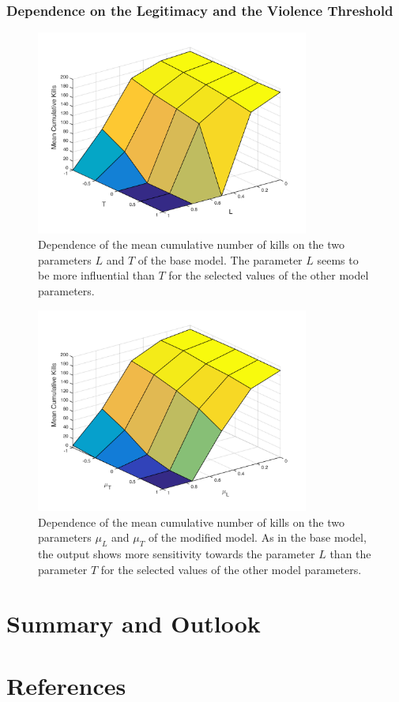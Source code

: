 \documentclass[11pt]{article}
\begin{document}
\subsubsection{Dependence on the Legitimacy and the Violence Threshold}
\begin{figure}[!htbp]
	\centering
		\includegraphics[width=0.80\textwidth]{../../code/base_model/L_T_dep_mean.png}
	\caption{Dependence of the mean cumulative number of kills on the two parameters $L$ and $T$ of the base model. The parameter $L$ seems to be more influential than $T$ for the selected values of the other model parameters.}
	\label{fig:L_T_dep_base}
\end{figure}
\begin{figure}[!htbp]
	\centering
		\includegraphics[width=0.80\textwidth]{../../code/modified_model/L_T_mean_dep_mean.png}
	\caption{Dependence of the mean cumulative number of kills on the two parameters $\mu_L$ and $\mu_T$ of the modified model. As in the base model, the output shows more sensitivity towards the parameter $L$ than the parameter $T$ for the selected values of the other model parameters.}
	\label{fig:L_T_dep_mod}
\end{figure}

\section{Summary and Outlook}

\section{References}
\end{document}
